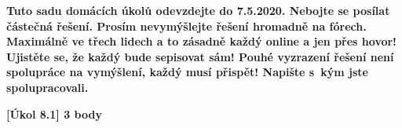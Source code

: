 \textbf{
	Tuto sadu domácích úkolů odevzdejte do 7.5.2020.
	Nebojte se posílat částečná řešení.
	Prosím nevymýšlejte řešení hromadně na fórech.
	Maximálně ve třech lidech a to zásadně každý online a jen přes hovor!
	Ujistěte se, že každý bude sepisovat sám!
	Pouhé vyzrazení řešení není spolupráce na vymýšlení, každý musí přispět!
	Napište s~kým jste spolupracovali.
}

\textbf{[Úkol 8.1] 3 body}


